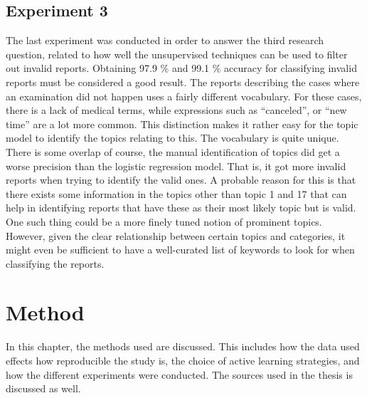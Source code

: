\subsection{Experiment 3}

The last experiment was conducted in order to answer the third research question, related to how well the unsupervised techniques can be used to filter out invalid reports.
Obtaining 97.9 \% and 99.1 \% accuracy for classifying invalid reports must be considered a good result.
The reports describing the cases where an examination did not happen uses a fairly different vocabulary.
For these cases, there is a lack of medical terms, while expressions such as ``canceled'', or ``new time'' are a lot more common.
This distinction makes it rather easy for the topic model to identify the topics relating to this.
The vocabulary is quite unique.
There is some overlap of course, the manual identification of topics did get a worse precision than the logistic regression model.
That is, it got more invalid reports when trying to identify the valid ones.
A probable reason for this is that there exists some information in the topics other than topic 1 and 17 that can help in identifying reports that have these as their most likely topic but is valid.
One such thing could be a more finely tuned notion of prominent topics.
However, given the clear relationship between certain topics and categories, it might even be sufficient to have a well-curated list of keywords to look for when classifying the reports.



\section{Method}
\label{sec:discussion-method}

In this chapter, the methods used are discussed.
This includes how the data used effects how reproducible the study is, the choice of active learning strategies,  and how the different experiments were conducted.
The sources used in the thesis is discussed as well.

